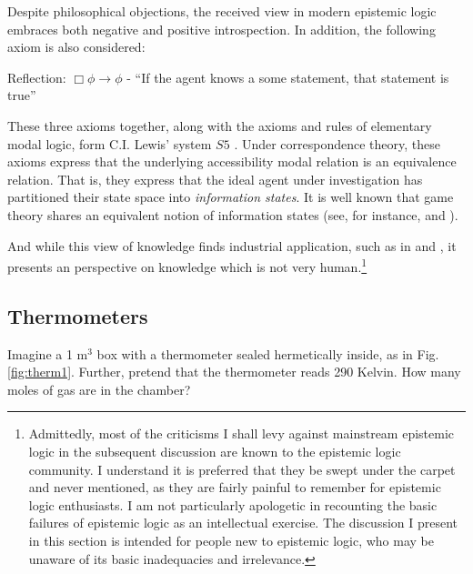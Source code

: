 \documentclass[11pt]{article}
\numberwithin{equation}{subsection}
\begin{document}
Despite philosophical objections, the received view in modern
epistemic logic embraces both negative and positive introspection.  In
addition, the following axiom is also considered:
\begin{bul}
	\item Reflection: $\Box \phi \to \phi$ - ``If the agent knows a some statement, that statement is true''
\end{bul}
These three axioms together, along with the axioms and rules of elementary modal logic, form C.I. Lewis' system $S5$ \citep{lewis_symbolic_1951}.  Under correspondence theory, these axioms express that the underlying accessibility modal relation is an equivalence relation. That is, they express that the ideal agent under investigation has partitioned their state space into \emph{information states}.  It is well known that game theory shares an equivalent notion of information states (see, for instance, \citet{halpern_set-theoretic_1999} and \citet[chapter 3]{rubinstein_modeling_1998}).

And while this view of knowledge finds industrial application, such as
in \citet{agray_ban_2002} and
\citet{hommersom_toward_2005,hommersom_update_2004}, it presents an
perspective on knowledge which is not very human.\footnote{Admittedly,
  most of the criticisms I shall levy against mainstream epistemic
  logic in the subsequent discussion are known to the
  epistemic logic community.  I understand it is preferred that they
  be swept under the carpet and never mentioned, as they are fairly painful
  to remember for epistemic logic enthusiasts. I am not particularly
  apologetic in recounting the basic failures of epistemic logic as an 
  intellectual exercise.  The discussion I present in this section is
  intended for people new to epistemic logic, who may be unaware of
  its basic inadequacies and irrelevance.}


\subsection{Thermometers}\label{thermometers}
Imagine a 1 m$^3$ box with a thermometer sealed hermetically inside, as in Fig.  \ref{fig:therm1}.  Further, pretend that the thermometer reads 290 Kelvin.  How many moles of gas are in the chamber?
\end{document}
